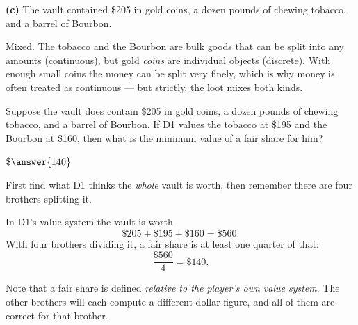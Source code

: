 \documentclass[12pt]{ximera}
\begin{document}
\begin{problem}
\begin{prompt}
\textbf{(c)} The vault contained \$205 in gold coins, a dozen pounds of chewing
tobacco, and a barrel of Bourbon.

\begin{multipleChoice}
\end{multipleChoice}

\begin{feedback}
Mixed. The tobacco and the Bourbon are bulk goods that can be split into any amounts
(continuous), but gold \emph{coins} are individual objects (discrete). With enough small
coins the money can be split very finely, which is why money is often treated as
continuous --- but strictly, the loot mixes both kinds.
\end{feedback}
\end{prompt}
\end{problem}

\begin{problem}
Suppose the vault does contain \$205 in gold coins, a dozen pounds of chewing tobacco,
and a barrel of Bourbon. If D1 values the tobacco at \$195 and the Bourbon at \$160,
then what is the minimum value of a fair share for him?

$\$\answer{140}$

\begin{hint}
First find what D1 thinks the \emph{whole} vault is worth, then remember there are
four brothers splitting it.
\end{hint}

\begin{feedback}
In D1's value system the vault is worth
\[ \$205 + \$195 + \$160 = \$560. \]
With four brothers dividing it, a fair share is at least one quarter of that:
\[ \frac{\$560}{4} = \$140. \]

Note that a fair share is defined \emph{relative to the player's own value system}.
The other brothers will each compute a different dollar figure, and all of them are
correct for that brother.
\end{feedback}
\end{problem}
\end{document}
